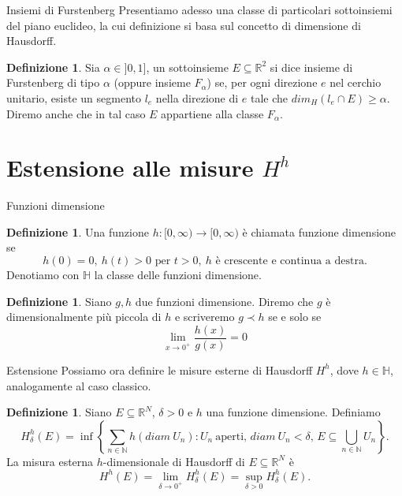 \documentclass[intlimits]{beamer}
\numberwithin{equation}{section}
\theoremstyle{plain}
\theoremstyle{definition}
\newtheorem{defin}[teor]{Definizione}
\theoremstyle{remark}
\newcommand{\gra}[1]{\left\{#1\right\}}
\renewcommand{\geq}{\geqslant}
\begin{document}
\begin{frame}{Insiemi di Furstenberg}
Presentiamo adesso una classe di particolari sottoinsiemi del
piano euclideo, la cui definizione si basa sul concetto di dimensione
di Hausdorff.
\pause
\bigskip
\begin{defin} Sia $\alpha \in ]0,1]$,
un sottoinsieme $E\subseteq \mathbb{R}^2$ si dice insieme di Furstenberg di 
tipo $\alpha$ (oppure insieme $F_\alpha$) se, per ogni direzione $e$ 
nel cerchio unitario, esiste un segmento $l_e$ nella direzione di $e$ tale che
$dim_H(l_e \cap E) \geq \alpha$. Diremo anche che in tal caso $E$ appartiene alla classe $F_\alpha$.\end{defin}
\end{frame}





\section{Estensione alle misure $H^h$}
\begin{frame}{Funzioni dimensione}
\begin{defin} Una funzione $h : [0,\infty) \longrightarrow [0,\infty)$ è chiamata funzione dimensione se
\[h(0) = 0,\ h(t)>0 \text{ per } t > 0,\ h \text{ è crescente e continua a destra.}\]
Denotiamo con $\mathbb{H}$ la classe delle funzioni dimensione.
\end{defin}
\pause
\begin{defin} Siano $g,h$ due funzioni dimensione. Diremo che $g$ è dimensionalmente più piccola
di $h$ e scriveremo $g \prec h$ se e solo se 
\[\lim_{x\to 0^+} \dfrac{h(x)}{g(x)} = 0 \]
\end{defin}
\end{frame}


\begin{frame}{Estensione}
Possiamo ora definire le misure esterne di Hausdorff $H^h$, dove $h \in \mathbb{H}$, analogamente al caso classico.
\bigskip
\begin{defin} Siano $E \subseteq \mathbb{R}^N$, $\delta > 0$ e $h$ una funzione dimensione. Definiamo
  \[ H^h_\delta(E) = \inf\gra{ \sum_{n \in \mathbb{N}}h(diam\ U_n): U_n\ 
  \text{aperti},\, diam\ {U_n} < \delta,\, E \subseteq \bigcup_{n \in \mathbb{N}}U_n} .\]
\pause
La misura esterna $h$-dimensionale di Hausdorff di $E \subseteq \mathbb{R}^N$ è
\[ H^h(E) = \lim_{\delta\to0^+}H^{h}_{\delta}(E) = \sup_{\delta > 0}H^{h}_{\delta}(E).\]\end{defin}
\end{frame}
\end{document}
